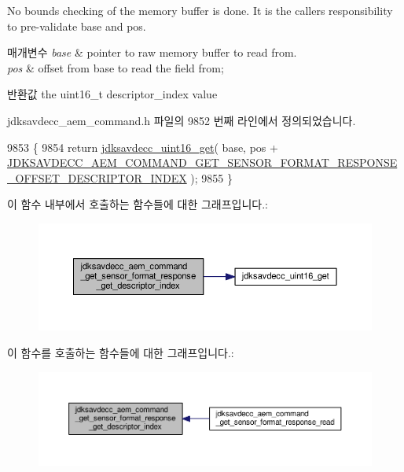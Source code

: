 No bounds checking of the memory buffer is done. It is the caller\textquotesingle{}s responsibility to pre-\/validate base and pos.


\begin{DoxyParams}{매개변수}
{\em base} & pointer to raw memory buffer to read from. \\
\hline
{\em pos} & offset from base to read the field from; \\
\hline
\end{DoxyParams}
\begin{DoxyReturn}{반환값}
the uint16\+\_\+t descriptor\+\_\+index value 
\end{DoxyReturn}


jdksavdecc\+\_\+aem\+\_\+command.\+h 파일의 9852 번째 라인에서 정의되었습니다.


\begin{DoxyCode}
9853 \{
9854     \textcolor{keywordflow}{return} \hyperlink{group__endian_ga3fbbbc20be954aa61e039872965b0dc9}{jdksavdecc\_uint16\_get}( base, pos + 
      \hyperlink{group__command__get__sensor__format__response_ga8522e66851b5c775f947a56a281a1738}{JDKSAVDECC\_AEM\_COMMAND\_GET\_SENSOR\_FORMAT\_RESPONSE\_OFFSET\_DESCRIPTOR\_INDEX}
       );
9855 \}
\end{DoxyCode}


이 함수 내부에서 호출하는 함수들에 대한 그래프입니다.\+:
\nopagebreak
\begin{figure}[H]
\begin{center}
\leavevmode
\includegraphics[width=350pt]{group__command__get__sensor__format__response_ga2f91d0ef4f00b5e3d44b0fe08a3e5f39_cgraph}
\end{center}
\end{figure}




이 함수를 호출하는 함수들에 대한 그래프입니다.\+:
\nopagebreak
\begin{figure}[H]
\begin{center}
\leavevmode
\includegraphics[width=350pt]{group__command__get__sensor__format__response_ga2f91d0ef4f00b5e3d44b0fe08a3e5f39_icgraph}
\end{center}
\end{figure}


